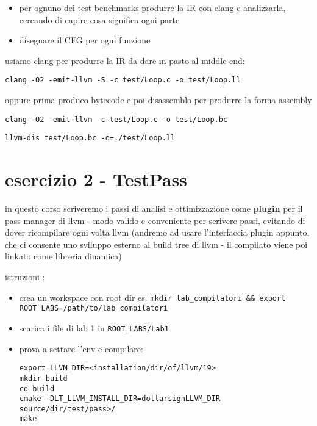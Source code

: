 \begin{itemize}
  \item per ognuno dei test benchmarks produrre la IR con clang e analizzarla, cercando di capire cosa significa ogni parte
  \item disegnare il CFG per ogni funzione
\end{itemize}

\begin{emphasize}
    usiamo clang per produrre la IR da dare in pasto al middle-end:

    \lstinline|clang -O2 -emit-llvm -S -c test/Loop.c -o test/Loop.ll|

    oppure prima produco bytecode e poi disassemblo per produrre la forma assembly

    \lstinline|clang -O2 -emit-llvm -c test/Loop.c -o test/Loop.bc|

    \lstinline|llvm-dis test/Loop.bc -o=./test/Loop.ll|
\end{emphasize}

\section{esercizio 2 - TestPass}

in questo corso scriveremo i passi di analisi e ottimizzazione come \textbf{plugin} per il pass manager di llvm - modo valido e conveniente per scrivere passi, evitando di dover ricompilare ogni volta llvm (andremo ad usare l'interfaccia plugin appunto, che ci consente uno sviluppo esterno al build tree di llvm - il compilato viene poi linkato come libreria dinamica)

\begin{emphasize-blue}
   istruzioni :
   \begin{itemize}
     \item crea un workspace con root dir es. \lstinline|mkdir lab_compilatori && export ROOT_LABS=/path/to/lab_compilatori| 
     \item scarica i file di lab 1 in \lstinline|ROOT_LABS/Lab1|
     \item prova a settare l'env e compilare: 
       \begin{lstlisting}
export LLVM_DIR=<installation/dir/of/llvm/19>
mkdir build
cd build
cmake -DLT_LLVM_INSTALL_DIR=dollarsignLLVM_DIR
source/dir/test/pass>/
make\end{lstlisting}
     
   \end{itemize}
\end{emphasize-blue}

